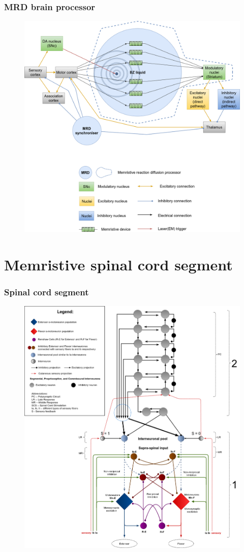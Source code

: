 \documentclass[12pt, aspectratio=169]{beamer}
\begin{document}
\begin{frame}
  \frametitle{MRD brain processor}
  
\begin{figure}
\includegraphics[width=0.85\linewidth]{MRD_modulator_synchroniser}
\end{figure}

\end{frame}

\section{Memristive spinal cord segment}

\begin{frame}
  \frametitle{Spinal cord segment}
  
\begin{figure}
\includegraphics[width=0.48\linewidth]{spinal-cord-diagram}
\end{figure}

\end{frame}
\end{document}
